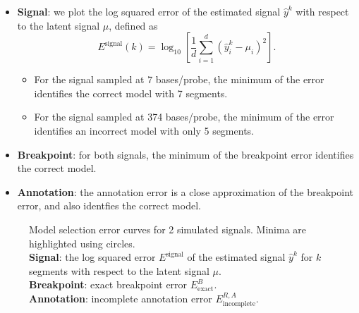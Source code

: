 \documentclass{article}
\begin{document}
\newpage

\begin{itemize}
\item \textbf{Signal}: we plot the log squared error of the estimated
  signal $\hat y^k$ with respect to the latent signal $\mu$, defined
  as
  \begin{equation}
    \label{eq:signal_cost}
    E^{\text{signal}}(k) = \log_{10}\left[
\frac 1 d \sum_{i=1}^d(\hat y_i^k - \mu_i)^2
\right].
  \end{equation}
  \begin{itemize}
\item For the signal sampled at 7 bases/probe, the minimum of the
  error identifies the correct model with 7 segments.
\item For the signal sampled at 374 bases/probe, the minimum of the
  error identifies an incorrect model with only 5
  segments.
  \end{itemize}
\item \textbf{Breakpoint}: for both signals, the minimum of the
  breakpoint error identifies the correct model. 
\item \textbf{Annotation}: the annotation error is a close
  approximation of the breakpoint error, and also identfies the
  correct model.
\end{itemize}
\begin{figure}[H]
  \centering
  
  \caption{Model selection error curves for 2 simulated
    signals. Minima are highlighted using circles.
    \protect\\
    \textbf{Signal}: the log squared error $E^{\text{signal}}$ of the
    estimated signal $\hat y^k$ for $k$ segments with respect to the
    latent signal $\mu$.
    \protect\\
    \textbf{Breakpoint}: exact breakpoint error $E^B_{\text{exact}}$.
    \protect\\
    \textbf{Annotation}: incomplete annotation error
    $E^{R,A}_{\text{incomplete}}$.
}
  \label{fig:variable-density-sigerr-small}
\end{figure}

\newpage
\end{document}
